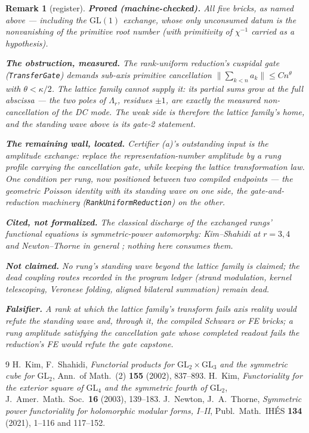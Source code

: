 \documentclass[11pt]{article}
\newtheorem{remark}[theorem]{Remark}
\begin{document}
\begin{remark}[register]
\textbf{Proved (machine-checked).}  All five bricks, as named above — including
the $\mathrm{GL}(1)$ exchange, whose only unconsumed datum is the nonvanishing of the
primitive root number (with primitivity of $\chi^{-1}$ carried as a hypothesis).

\textbf{The obstruction, measured.}  The rank-uniform reduction's cuspidal gate
(\texttt{TransferGate}) demands sub-axis primitive cancellation
$\|\sum_{k<n}a_k\|\le Cn^{\theta}$ with $\theta<\kappa/2$.  The lattice family cannot
supply it: its partial sums grow at the full abscissa — the two poles of
$\Lambda_r$, residues $\pm1$, are exactly the measured non-cancellation of the DC
mode.  The weak side is therefore the lattice family's home, and the standing wave above
is its gate-2 statement.

\textbf{The remaining wall, located.}  Certifier (a)'s outstanding input is the
\emph{amplitude exchange}: replace the representation-number amplitude by a rung
profile carrying the cancellation gate, while keeping the lattice transformation law.
One condition per rung, now positioned between two compiled endpoints — the geometric
Poisson identity with its standing wave on one side, the gate-and-reduction machinery
(\texttt{RankUniformReduction}) on the other.

\textbf{Cited, not formalized.}  The classical discharge of the exchanged rungs'
functional equations is symmetric-power automorphy: Kim--Shahidi at $r=3,4$
\cite{KimShahidi,Kim} and Newton--Thorne in general \cite{NT}; nothing here consumes
them.

\textbf{Not claimed.}  No rung's standing wave beyond the lattice family is claimed; the
dead coupling routes recorded in the program ledger (strand modulation, kernel
telescoping, Veronese folding, aligned bilateral summation) remain dead.

\textbf{Falsifier.}  A rank at which the lattice family's transform fails axis reality
would refute the standing wave and, through it, the compiled Schwarz or FE bricks; a
rung amplitude satisfying the cancellation gate whose completed readout fails the
reduction's FE would refute the gate capstone.
\end{remark}

\begin{thebibliography}{9}
 H.~Kim, F.~Shahidi,
\emph{Functorial products for $\mathrm{GL}_2\times\mathrm{GL}_3$ and the symmetric
cube for $\mathrm{GL}_2$}, Ann.\ of Math.\ (2) \textbf{155} (2002), 837--893.
 H.~Kim,
\emph{Functoriality for the exterior square of $\mathrm{GL}_4$ and the symmetric
fourth of $\mathrm{GL}_2$}, J.\ Amer.\ Math.\ Soc.\ \textbf{16} (2003), 139--183.
 J.~Newton, J.~A.~Thorne,
\emph{Symmetric power functoriality for holomorphic modular forms, I--II},
Publ.\ Math.\ IH\'ES \textbf{134} (2021), 1--116 and 117--152.
\end{thebibliography}
\end{document}
